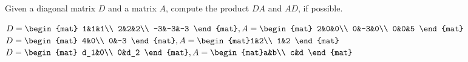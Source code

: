 
\begin{Exercise}[
name={},
title={}, 
difficulty=0,
origin={\cite{GH}}]
Given a diagonal matrix $D$ and a matrix $A$, compute the product $DA$ and $AD$, if possible.
\begin{multicols}{2}
\Question $D=\begin{mat} 1&1&1\\  2&2&2\\  -3&-3&-3 \end{mat}, \\ A=\begin{mat} 2&0&0\\  0&-3&0\\  0&0&5 \end{mat}$
\Question $D=\begin{mat} 4&0\\  0&-3 \end{mat}, \\ A=\begin{mat}1&2\\  1&2  \end{mat}$
\Question $D=\begin{mat} d_1&0\\  0&d_2 \end{mat}, \\ A=\begin{mat}a&b\\  c&d  \end{mat}$

\end{multicols}
\end{Exercise}
